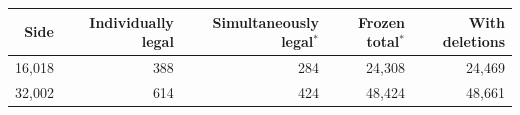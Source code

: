\small\begin{tabular}{r r r r r}
\toprule Side & Individually legal & Simultaneously legal$^{*}$ & Frozen total$^{*}$ & With deletions\\\midrule
16,018 & 388 & 284 & 24,308 & 24,469\\
32,002 & 614 & 424 & 48,424 & 48,661\\
\bottomrule\end{tabular}

